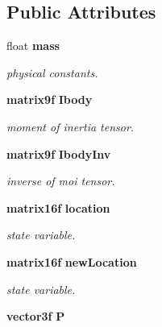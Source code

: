 \subsection*{Public Attributes}
\begin{CompactItemize}
\item 
{}
float {\bf mass}\label{classmovable_m0}

\begin{CompactList}\small\item\em physical constants.\item\end{CompactList}\item 
{}
{\bf matrix9f} {\bf Ibody}\label{classmovable_m1}

\begin{CompactList}\small\item\em moment of inertia tensor.\item\end{CompactList}\item 
{}
{\bf matrix9f} {\bf Ibody\-Inv}\label{classmovable_m2}

\begin{CompactList}\small\item\em inverse of moi tensor.\item\end{CompactList}\item 
{}
{\bf matrix16f} {\bf location}\label{classmovable_m3}

\begin{CompactList}\small\item\em state variable.\item\end{CompactList}\item 
{}
{\bf matrix16f} {\bf new\-Location}\label{classmovable_m4}

\begin{CompactList}\small\item\em state variable.\item\end{CompactList}\item 
{}
{\bf vector3f} {\bf P}\label{classmovable_m5}


\end{CompactItemize}
